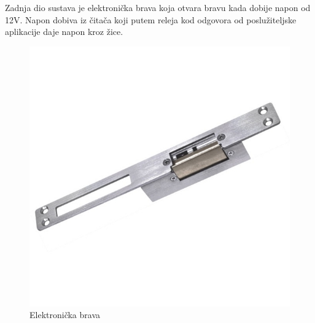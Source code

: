 \documentclass[times, utf8, zavrsni]{fer}
\begin{document}
Zadnja dio sustava je elektronička brava koja otvara bravu kada dobije napon od 12V. Napon dobiva iz čitača koji putem releja kod odgovora od poslužiteljske aplikacije daje napon kroz žice. 

\begin{figure}[h]
\includegraphics[scale=1]{brava.jpg}
\centering
\caption{Elektronička brava \citep{15}}
\centering
\end{figure}
\end{document}
